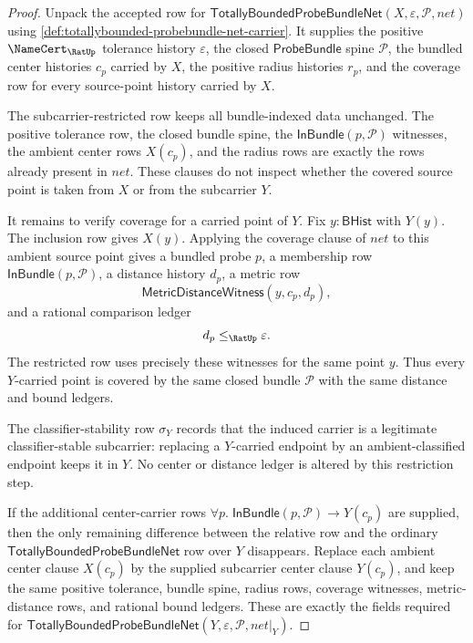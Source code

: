 \begin{proof}
Unpack the accepted row for
$\mathsf{TotallyBoundedProbeBundleNet}(X,\varepsilon,\mathcal{P},net)$ using
\autoref{def:totallybounded-probebundle-net-carrier}. It supplies the positive
$\NameCert_{\RatUp}$ tolerance history $\varepsilon$, the closed
$\mathsf{ProbeBundle}$ spine $\mathcal{P}$, the bundled center histories
$c_p$ carried by $X$, the positive radius histories $r_p$, and the coverage row
for every source-point history carried by $X$.

The subcarrier-restricted row keeps all bundle-indexed data unchanged. The
positive tolerance row, the closed bundle spine, the
$\mathsf{InBundle}(p,\mathcal{P})$ witnesses, the ambient center rows
$X(c_p)$, and the radius rows are exactly the rows already present in $net$.
These clauses do not inspect whether the covered source point is taken from
$X$ or from the subcarrier $Y$.

It remains to verify coverage for a carried point of $Y$. Fix
$y:\mathsf{BHist}$ with $Y(y)$. The inclusion row gives $X(y)$. Applying the
coverage clause of $net$ to this ambient source point gives a bundled probe
$p$, a membership row $\mathsf{InBundle}(p,\mathcal{P})$, a distance history
$d_p$, a metric row
$$
\mathsf{MetricDistanceWitness}(y,c_p,d_p),
$$
and a rational comparison ledger
$$
d_p\leq_{\RatUp}\varepsilon.
$$
The restricted row uses precisely these witnesses for the same point $y$.
Thus every $Y$-carried point is covered by the same closed bundle
$\mathcal{P}$ with the same distance and bound ledgers.

The classifier-stability row $\sigma_Y$ records that the induced carrier is a
legitimate classifier-stable subcarrier: replacing a $Y$-carried endpoint by an
ambient-classified endpoint keeps it in $Y$. No center or distance ledger is
altered by this restriction step.

If the additional center-carrier rows
$\forall p.\;\mathsf{InBundle}(p,\mathcal{P})\to Y(c_p)$ are supplied, then the
only remaining difference between the relative row and the ordinary
$\mathsf{TotallyBoundedProbeBundleNet}$ row over $Y$ disappears. Replace each
ambient center clause $X(c_p)$ by the supplied subcarrier center clause
$Y(c_p)$, and keep the same positive tolerance, bundle spine, radius rows,
coverage witnesses, metric-distance rows, and rational bound ledgers. These are
exactly the fields required for
$\mathsf{TotallyBoundedProbeBundleNet}(Y,\varepsilon,\mathcal{P},net|_Y)$.
\end{proof}

